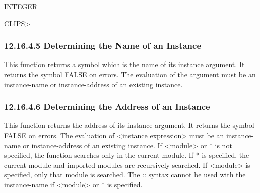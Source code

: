 \documentclass[letterpaper,10pt,english]{sphinxmanual}
\begin{document}
INTEGER

CLIPS\textgreater{}


\subsubsection{12.16.4.5 Determining the Name of an Instance}
\label{\detokenize{actions:determining-the-name-of-an-instance}}
This function returns a symbol which is the name of its instance
argument. It returns the symbol FALSE on errors. The evaluation of the
argument must be an instance-name or instance-address of an existing
instance.


\begin{sphinxVerbatim}[commandchars=\\\{\}]
 
\end{sphinxVerbatim}


\subsubsection{12.16.4.6 Determining the Address of an Instance}
\label{\detokenize{actions:determining-the-address-of-an-instance}}
This function returns the address of its instance argument. It returns
the symbol FALSE on errors. The evaluation of \textless{}instance expression\textgreater{} must
be an instance-name or instance-address of an existing instance. If
\textless{}module\textgreater{} or * is not specified, the function searches only in the
current module. If * is specified, the current module and imported
modules are recursively searched. If \textless{}module\textgreater{} is specified, only that
module is searched. The :: syntax cannot be used with the instance-name
if \textless{}module\textgreater{} or * is specified.


\begin{sphinxVerbatim}[commandchars=\\\{\}]
 \PYG{p}{[} \PYGZbs{} \PYGZbs{}\PYG{p}{]} 
\end{sphinxVerbatim}
\end{document}

